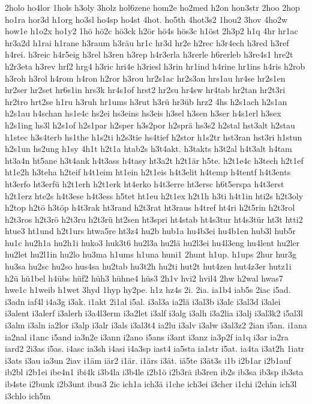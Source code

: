 {2holo
ho4lor
1hols
h3oly
3holz
hol6zene
hom2e
ho2med
h2on
hon3str
2hoo
2hop
ho1ra
hor3d
h1org
ho3sl
ho4sp
ho4st
4hot.
ho5th
4hot3s2
1hou2
3hov
4ho2w
how1e
h1o2x
ho1y2
1hö
hö2c
hö3ck
h2ör
hö4s
hös3c
h1öst
2h3p2
h1q
4hr
hr1ac
hr3a2d
h1rai
h1rane
h3raum
h3räu
hr1c
hr3d
hr2e
h2rec
h3r4ech
h3red
h3ref
h4rei.
h3reic
h4r5eig
h3rel
h3ren
h3rep
h4r3erla
h3rerle
h6rerleb
h3re4s1
hre2t
h2r3eta
h3rev
hrf2
hrg4
h3ric
hri4e
h3riesl
h3rin
hr1ind
h4rine
hr1ins
h4ris
h2rob
h3roh
h3rol
h4rom
h4ron
h2ror
h3rou
hr2s1ac
hr2s3an
hrs1au
hr4se
hr2s1en
hr2ser
hr2set
hr6s1in
hrs3k
hr4s1of
hrst2
hr2su
hr4sw
hr4tab
hr2tan
hr2t3ri
hr2tro
hrt2se
h1ru
h3ruh
hr1ums
h3rut
h3rü
hr3üb
hrz2
4hs
h2s1ach
h2s1an
h2s1au
h4schan
hs1e4c
hs2ei
hs3eins
hs3eis
h3sel
h3sen
h3ser
h4s1erl
h3sex
h2s1ing
hs3l
h2s1of
h2s1par
h2sper
h3s2por
h2sprä
hs3s2
h2stal
hst3alt
h2stau
h1stec
h3s4terb
hs1the
h1s2ti
h2s3tie
hs4tief
h2stor
h1s2tr
hst3ran
hst3ri
h1stun
h2s1un
hs2ung
h1sy
4h1t
h2t1a
htab2s
h3t4akt.
h3takts
h3t2al
h4t3alt
h4tam
ht3a4n
ht5ane
h3t4ank
h4t3ass
h4tasy
ht3a2t
h2t1är
h5te.
h2t1e4c
h3tech
h2t1ef
ht1e2h
h3teha
h2teif
h4t1eim
ht1ein
h2t1eis
h4t3elit
h4temp
h4tentf
h4t3ents
ht3erfo
ht3erfü
h2t1erh
h2t1erk
ht4erko
h4t3erre
ht3ersc
h6t5erspa
h4t3erst
h2t1erz
hte2s
h4t3ese
h4t3ess
h5tet
ht1eu
h2t1ex
h2t1h
h3ti
h4t1in
hti2s
h2t3oly
h2top
h2tö
h3töp
h4t3rak
ht3rand
h2t3rat
ht3raus
h4tref
ht4ri
h2t5rin
h2t3rol
h2t3ros
h2t3rö
h2t3ru
h2t3rü
ht2sen
ht3spri
ht4stab
ht4s3tur
ht4s3tür
ht3t
htti2
htue3
ht1und
h2t1urs
htwa5re
ht3z4
hu2b
hub1a
hu4b3ei
hu4b1en
hub3l
hub5r
hu1c
hu2h1a
hu2h1i
huko3
huk3t6
hu2l3a
hu2lä
hu2l3ei
hu4l3eng
hu4lent
hu2ler
hu2let
hu2l1in
hu2lo
hu3ma
h1ums
h1una
huni1
2hunt
h1up.
h1ups
2hur
hur3g
hu3sa
hu2sc
hu2so
hus4sa
hu2tab
hu3t2h
hu2ti
hut2t
hut4zen
hut4z3er
hutz1i
h2ü
hü1bel
h4übs
hüf2
hüh3
hühne4
hüs3
2h1v
hvi2
hvil4
2hw
h2wal
hwas7
hwe1c
h1weib
h1wet
3hyd
1hyp
hy2pe.
h1z
hz4s
2i.
2ia.
ia1b4
iab5s
2iac
i5ad.
i3adn
iaf4l
i4a3g
i3ak.
i1akt
2i1al
i5al.
i3al3a
ia2lä
i3al3b
i3alc
i3al3d
i3alei
i3alent
i3alerf
i3alerh
i3a4l3erm
i3a2let
i3alf
i3alg
i3alh
i3a2lia
i3alj
i3al3k2
i5al3l
i3alm
i3aln
ia2lor
i3alp
i3alr
i3als
i3al3t4
ia2lu
i3alv
i3alw
i3al3z2
2ian
i5an.
i1ana
ia2nal
i1anc
i5and
ia3n2e
i3ann
i2ano
i5ans
i3ant
i3anz
ia3p2f
ia1q
i3ar
ia2ra
iard2
2i3as
i5as.
i4asc
ia3sh
i4asi
i4a3sp
iast4
ia5sta
ia1str
i5at.
ia4ta
i3at2h
1iatr
i3ats
i3au
ia3un
2iav
i1äm
iär2
i1är.
i1ärs
i3ät.
iä5te
i3ät3s
i1b
i2b1ar
i2b1auf
ib2bl
i2b1ei
ibe4n1
ibi4k
i3b4la
i3b4le
i2b1ö
i2b3rä
ib3ren
ib2s
ib3sa
ib3sp
ib3sta
ib4ste
i2bunk
i2b3unt
ibus3
2ic
ich1a
ich3ä
i1che
ich3ei
i3cher
i1chi
i2chin
ich3l
i3chlo
ich5m
}
